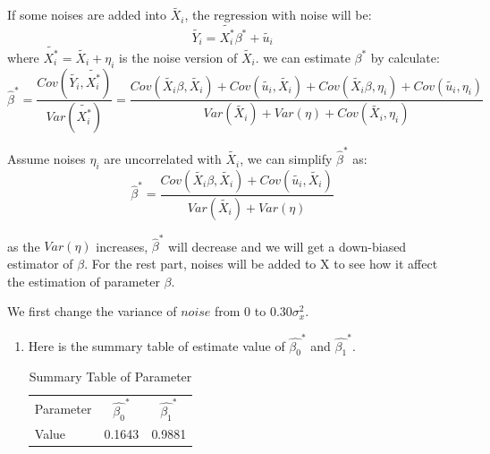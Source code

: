 \documentclass[12pt,letterpaper]{article}
\begin{document}
\begin{enumerate}[label=\textbf{(\Alph*)}]
If some noises are added into $\tilde{X_i}$, the regression with noise will be:
$$\tilde{Y_i}=\tilde{X_i^{*}}\beta^{*}+\tilde{u_i}$$
where $\tilde{X_i^{*}}=\tilde{X_i}+\eta_i$ is the noise version of $\tilde{X_i}$.
we can estimate $\beta^{*}$ by calculate:
$$\hat{\beta}^{*}=\frac{Cov(\tilde{Y_i},\tilde{X_i^{*}})}{Var(\tilde{X_i^{*}})}=\frac{Cov(\tilde{X_i}\beta,\tilde{X_i})+Cov(\tilde{u_i},\tilde{X_i})+Cov(\tilde{X_i}\beta,\eta_i)+Cov(\tilde{u_i},\eta_i)}{Var(\tilde{X_i})+Var(\eta)+Cov(\tilde{X_i},\eta_i)}$$

Assume noises $\eta_i$ are uncorrelated with $\tilde{X_i}$, we can simplify $\hat{\beta}^{*}$ as:
$$\hat{\beta}^{*}=\frac{Cov(\tilde{X_i}\beta,\tilde{X_i})+Cov(\tilde{u_i},\tilde{X_i})}{Var(\tilde{X_i})+Var(\eta)}$$

as the $Var(\eta)$ increases,  $\hat{\beta}^{*}$ will decrease and we will get a down-biased estimator of $\beta$. For the rest part, noises will be added to X to see how it affect the estimation of parameter $\beta$.\\
\newpage

We first change the variance of $noise$ from 0 to $0.30\sigma_x^2$.
\begin{enumerate}[label=(\roman*)]
\item Here is the summary table of estimate value of $\hat{\beta_0}^{*}$ and $\hat{\beta_1}^{*}$.
\begin{table}[ht]
	\footnotesize
	\caption{Summary Table of Parameter}
	\centering %
	\begin{tabular}{lcc} %
		
		\hline %
		\hline %
		Parameter&$\hat{\beta_0}^{*}$ & $\hat{\beta_1}^{*}$\\
		Value&0.1643&0.9881\\
		
		\hline %
		
	\end{tabular}
\end{table} 


\end{enumerate}
\end{enumerate}
\end{document}

